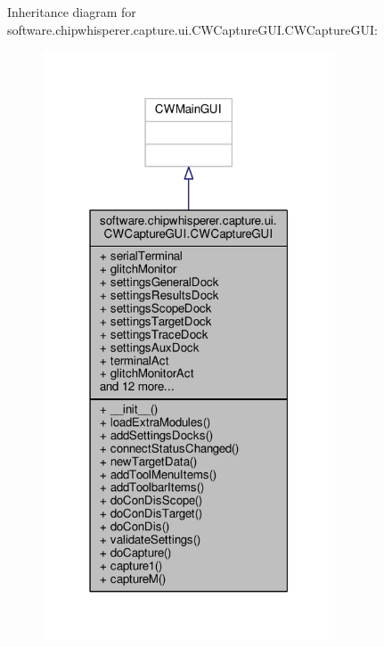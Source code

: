 Inheritance diagram for software.\+chipwhisperer.\+capture.\+ui.\+C\+W\+Capture\+G\+U\+I.\+C\+W\+Capture\+G\+U\+I\+:\nopagebreak
\begin{figure}[H]
\begin{center}
\leavevmode
\includegraphics[width=246pt]{df/de9/classsoftware_1_1chipwhisperer_1_1capture_1_1ui_1_1CWCaptureGUI_1_1CWCaptureGUI__inherit__graph}
\end{center}
\end{figure}


